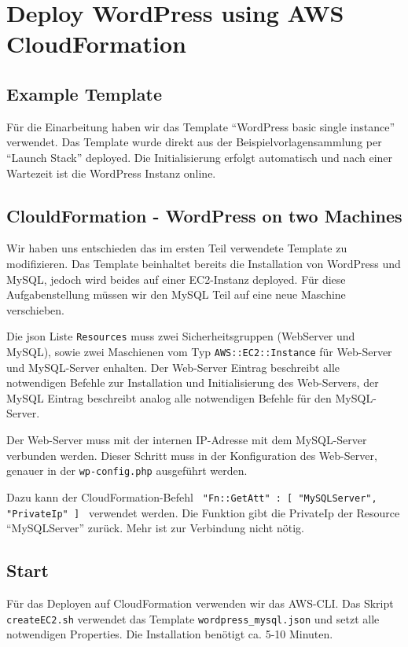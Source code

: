 \section{Deploy WordPress using AWS CloudFormation}

\subsection{Example Template}
Für die Einarbeitung haben wir das Template \enquote{WordPress basic single instance} verwendet. Das Template wurde direkt aus der Beispielvorlagensammlung per \enquote{Launch Stack} deployed. Die Initialisierung erfolgt automatisch und nach einer Wartezeit ist die WordPress Instanz online.

\subsection{ClouldFormation - WordPress on two Machines}
Wir haben uns entschieden das im ersten Teil verwendete Template zu modifizieren. Das Template beinhaltet bereits die Installation von WordPress und MySQL, jedoch wird beides auf einer EC2-Instanz deployed. Für diese Aufgabenstellung müssen wir den MySQL Teil auf eine neue Maschine verschieben.

Die json Liste \texttt{Resources} muss zwei Sicherheitsgruppen (WebServer und MySQL), sowie zwei Maschienen vom Typ \texttt{AWS::EC2::Instance} für Web-Server und MySQL-Server enhalten. Der Web-Server Eintrag beschreibt alle notwendigen Befehle zur Installation und Initialisierung des Web-Servers, der MySQL Eintrag beschreibt analog alle notwendigen Befehle für den MySQL-Server.

Der Web-Server muss mit der internen IP-Adresse mit dem MySQL-Server verbunden werden. Dieser Schritt muss in der Konfiguration des Web-Server, genauer in der \texttt{wp-config.php} ausgeführt werden.

Dazu kann der CloudFormation-Befehl \texttt{{ "Fn::GetAtt" : [ "MySQLServer", "PrivateIp" ] }} verwendet werden. Die Funktion gibt die PrivateIp der Resource \enquote{MySQLServer} zurück. Mehr ist zur Verbindung nicht nötig.

\subsection{Start}
Für das Deployen auf CloudFormation verwenden wir das AWS-CLI. Das Skript \texttt{createEC2.sh} verwendet das Template \texttt{wordpress\_mysql.json} und setzt alle notwendigen Properties. Die Installation benötigt ca. 5-10 Minuten.
